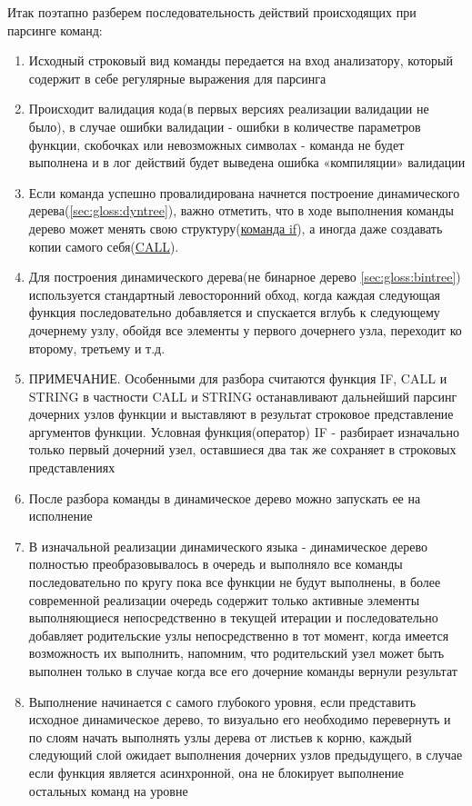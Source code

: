\documentclass[10pt]{book}
\begin{document}
        Итак поэтапно разберем последовательность действий происходящих при парсинге команд:
        \begin{enumerate}
            \item Исходный строковый вид команды передается на вход анализатору, который содержит в себе регулярные выражения для парсинга
            \item Происходит валидация кода(в первых версиях реализации валидации не было), в случае ошибки валидации - ошибки в количестве параметров функции, скобочках или невозможных символах - команда не будет выполнена и в лог действий будет выведена ошибка «компиляции» валидации
            \item Если команда успешно провалидирована начнется построение динамического дерева(\ref{sec:gloss:dyntree}), важно отметить, что в ходе выполнения команды дерево может менять свою структуру(\hyperref[sec:fif]{команда if}), а иногда даже создавать копии самого себя(\hyperref[sec:fcall]{CALL}). 
            \item Для построения динамического дерева(не бинарное дерево \ref{sec:gloss:bintree}) используется стандартный левосторонний обход, когда каждая следующая функция последовательно добавляется и спускается вглубь к следующему дочернему узлу, обойдя все элементы у первого дочернего узла, переходит ко второму, третьему и т.д.
            \item ПРИМЕЧАНИЕ. Особенными для разбора считаются функция IF, CALL и STRING в частности CALL и STRING останавливают дальнейший парсинг дочерних узлов функции и выставляют в результат строковое представление аргументов функции. Условная функция(оператор) IF - разбирает изначально только первый дочерний узел, оставшиеся два так же сохраняет в строковых представлениях
            \item После разбора команды в динамическое дерево можно запускать ее на исполнение 
            \item В изначальной реализации динамического языка - динамическое дерево полностью преобразовывалось в очередь и выполняло все команды последовательно по кругу пока все функции не будут выполнены, в более современной реализации очередь содержит только активные элементы выполняющиеся непосредственно в текущей итерации и последовательно добавляет родительские узлы непосредственно в тот момент, когда имеется возможность их выполнить, напомним, что родительский узел может быть выполнен только в случае когда все его дочерние команды вернули результат
            \item Выполнение начинается с самого глубокого уровня, если представить исходное динамическое дерево, то визуально его необходимо перевернуть и по слоям начать выполнять узлы дерева от листьев к корню, каждый следующий слой ожидает выполнения дочерних узлов предыдущего, в случае если функция является асинхронной, она не блокирует выполнение остальных команд на уровне

\end{enumerate}
\end{document}
